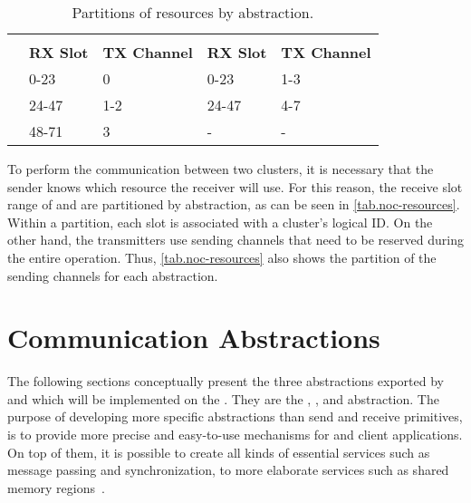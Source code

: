 		\begin{table}[!tb]
			\centering%
			\caption{Partitions of \noc resources by abstraction.}%
			\label{tab.noc-resources}%

			\begin{tabular}{l|l|l|l|l|}
				\cline{2-5}
														& \multicolumn{2}{c|}{\textbf{\cnoc}}    & \multicolumn{2}{c|}{\textbf{\dnoc}}    \\ \cline{2-5}
														& \textbf{RX Slot} & \textbf{TX Channel} & \textbf{RX Slot} & \textbf{TX Channel} \\ \hline
				\multicolumn{1}{|l|}{\textbf{\mailbox}} & 0-23             & 0                   & 0-23             & 1-3                 \\ \hline
				\multicolumn{1}{|l|}{\textbf{\portal}}  & 24-47            & 1-2                 & 24-47            & 4-7                 \\ \hline
				\multicolumn{1}{|l|}{\textbf{\sync}}    & 48-71            & 3                   & -                & -                   \\ \hline
			\end{tabular}

		\end{table}

		To perform the communication between two clusters, it is necessary that the
		sender knows which resource the receiver will use.
		For this reason, the receive slot range of \cnoc and \dnoc are partitioned
		by abstraction, as can be seen in \autoref{tab.noc-resources}.
		Within a partition, each slot is associated with a cluster's logical ID.
		On the other hand, the transmitters use sending channels that need to
		be reserved during the entire operation.
		Thus, \autoref{tab.noc-resources} also shows the partition of the
		sending channels for each abstraction.

	\section{Communication Abstractions}
	\label{sec.comm-abstractions}

		The following sections conceptually present the three abstractions
		exported by \hal and which will be implemented on the \mppa.
		They are the \sync, \mailbox, and \portal abstraction.
		The purpose of developing more specific abstractions than
		send and receive primitives, is to provide more precise and easy-to-use
		mechanisms for \os and client applications.
		On top of them, it is possible to create all kinds of essential
		services such as message passing and synchronization,
		to more elaborate services such as shared memory regions~\cite{penna:rmen}.

